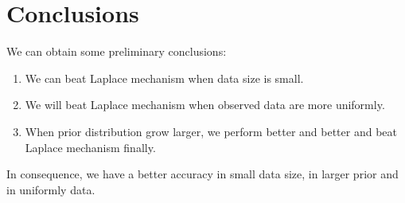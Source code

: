 \documentclass[sigconf, anonymous]{acmart}
\begin{document}


\section{Conclusions}
We can obtain some preliminary conclusions: 
\begin{enumerate}
	\item We can beat Laplace mechanism when data size is small.
	\item We will beat Laplace mechanism when observed data are more uniformly.
  \item When prior distribution grow larger, we perform better and better and beat Laplace mechanism finally.
\end{enumerate} 

In consequence, we have a better accuracy in small data size, in larger prior and in uniformly data.





\end{document}
